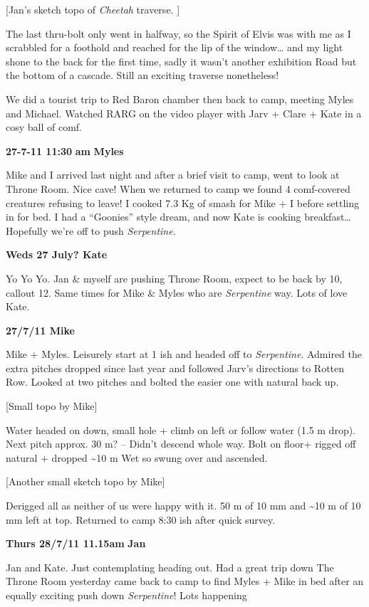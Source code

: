 {[}Jan's sketch topo of \emph{Cheetah} traverse. {]}

The last thru-bolt only went in halfway, so the Spirit of Elvis was with
me as I scrabbled for a foothold and reached for the lip of the
window\ldots{} and my light shone to the back for the first time, sadly
it wasn't another exhibition Road but the bottom of a cascade. Still an
exciting traverse nonetheless!

We did a tourist trip to Red Baron chamber then back to camp, meeting
Myles and Michael. Watched RARG on the video player with Jarv + Clare +
Kate in a cosy ball of comf.

\textbf{27-7-11 11:30} \textbf{am} \textbf{Myles}

Mike and I arrived last night and after a brief visit to camp, went to
look at Throne Room. Nice cave! When we returned to camp we found 4
comf-covered creatures refusing to leave! I cooked 7.3 Kg of smash for
Mike + I before settling in for bed. I had a ``Goonies'' style dream,
and now Kate is cooking breakfast\ldots{} Hopefully we're off to push
\emph{Serpentine}.

\textbf{Weds 27 July? Kate}

Yo Yo Yo. Jan \& myself are pushing Throne Room, expect to be back by
10, callout 12. Same times for Mike \& Myles who are \emph{Serpentine}
way. Lots of love Kate.

\textbf{27/7/11 Mike}

Mike + Myles. Leisurely start at 1 ish and headed off to
\emph{Serpentine}. Admired the extra pitches dropped since last year and
followed Jarv's directions to Rotten Row. Looked at two pitches and
bolted the easier one with natural back up.

{[}Small topo by Mike{]}

Water headed on down, small hole + climb on left or follow water (1.5 m
drop). Next pitch approx. 30 m? -- Didn't descend whole way. Bolt on
floor+ rigged off natural + dropped \textasciitilde 10 m Wet so swung
over and ascended.

{[}Another small sketch topo by Mike{]}

Derigged all as neither of us were happy with it. 50 m of 10 mm and
\textasciitilde 10 m of 10 mm left at top. Returned to camp 8:30 ish
after quick survey.

\textbf{Thurs 28/7/11 11.15am} \textbf{Jan}

Jan and Kate. Just contemplating heading out. Had a great trip down The
Throne Room yesterday came back to camp to find Myles + Mike in bed
after an equally exciting push down \emph{Serpentine}! Lots happening


